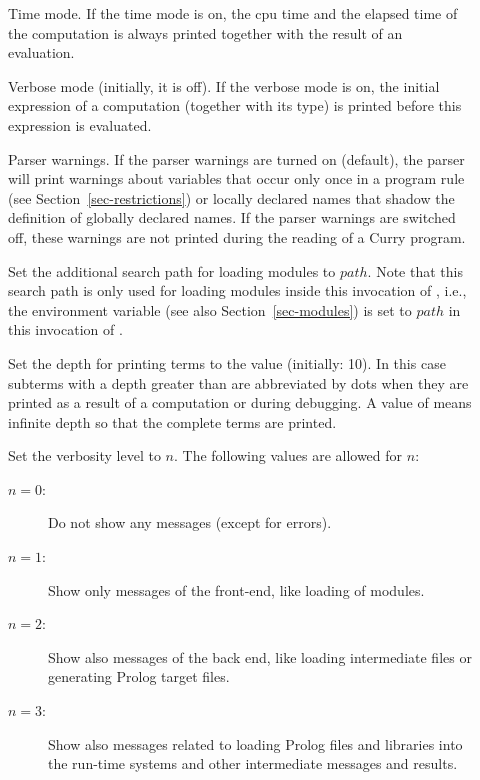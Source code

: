 \begin{description}
\item[] Time mode. If the time mode is on,
the cpu time and the elapsed time
of the computation is always printed together with the result
of an evaluation.

\item[] Verbose mode (initially, it is off).
If the verbose mode is on,
the initial expression of a computation (together with its type)
is printed before this expression is evaluated.

\item[] Parser warnings. If the parser
warnings are turned on (default), the parser will print
warnings about variables that occur only once in a program rule
(see Section~\ref{sec-restrictions})
or locally declared names that shadow the definition of
globally declared names. If the parser warnings are switched off,
these warnings are not printed during the reading of a Curry program.

\item[] Set the additional search path
for loading modules to $path$.
Note that this search path is only used for loading modules
inside this invocation of \CYS, i.e., the environment variable
 (see also Section~\ref{sec-modules})
is set to $path$ in this invocation of \CYS.

\item[]
Set the depth for printing terms to the value  (initially: 10).
In this case subterms with a depth greater than  are abbreviated
by dots when they are printed as a result of a computation
or during debugging. A value of  means infinite depth
so that the complete terms are printed.

\item[]
Set the verbosity level to $n$. The following values are allowed
for $n$:
\begin{description}
\item[$n=0$:] Do not show any messages (except for errors).
\item[$n=1$:] Show only messages of the front-end, like loading
of modules.
\item[$n=2$:]
Show also messages of the back end, like loading intermediate files
or generating Prolog target files.
\item[$n=3$:]
Show also messages related to loading Prolog files and libraries
into the run-time systems and other intermediate messages and results.
\end{description}


\end{description}
